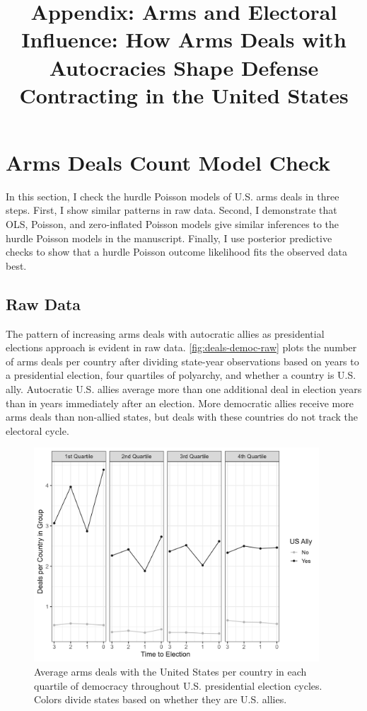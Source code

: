 \documentclass[12pt]{article}
\title{\textbf{Appendix: Arms and Electoral Influence: How Arms Deals with Autocracies Shape Defense Contracting in the United States}}
\date{}
\begin{document}
\maketitle 

\singlespace 

\tableofcontents

\bigskip





\section{Arms Deals Count Model Check}

In this section, I check the hurdle Poisson models of U.S. arms deals in three steps. 
First, I show similar patterns in raw data. 
Second, I demonstrate that OLS, Poisson, and zero-inflated Poisson models give similar inferences to the hurdle Poisson models in the manuscript. 
Finally, I use posterior predictive checks to show that a hurdle Poisson outcome likelihood fits the observed data best. 


\subsection{Raw Data}

The pattern of increasing arms deals with autocratic allies as presidential elections approach is evident in raw data.
\autoref{fig:deals-democ-raw} plots the number of arms deals per country after dividing state-year observations based on years to a presidential election, four quartiles of polyarchy, and whether a country is U.S. ally.
Autocratic U.S. allies average more than one additional deal in election years than in years immediately after an election. 
More democratic allies receive more arms deals than non-allied states, but deals with these countries do not track the electoral cycle. 


\begin{figure}[htpb]
	\centering
		\includegraphics[width=0.95\textwidth]{deals-democ-raw.png}
	\caption{Average arms deals with the United States per country in each quartile of democracy throughout U.S. presidential election cycles. Colors divide states based on whether they are U.S. allies.}
	\label{fig:deals-democ-raw}
\end{figure}
\end{document}

